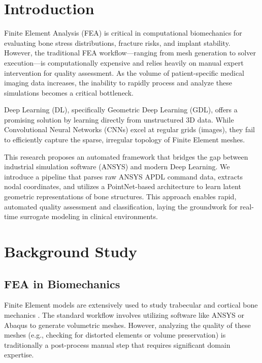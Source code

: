 \documentclass[conference]{IEEEtran}
\begin{document}
\section{Introduction}
Finite Element Analysis (FEA) is critical in computational biomechanics for evaluating bone stress distributions, fracture risks, and implant stability. However, the traditional FEA workflow—ranging from mesh generation to solver execution—is computationally expensive and relies heavily on manual expert intervention for quality assessment. As the volume of patient-specific medical imaging data increases, the inability to rapidly process and analyze these simulations becomes a critical bottleneck.

Deep Learning (DL), specifically Geometric Deep Learning (GDL), offers a promising solution by learning directly from unstructured 3D data. While Convolutional Neural Networks (CNNs) excel at regular grids (images), they fail to efficiently capture the sparse, irregular topology of Finite Element meshes. 

This research proposes an automated framework that bridges the gap between industrial simulation software (ANSYS) and modern Deep Learning. We introduce a pipeline that parses raw ANSYS APDL command data, extracts nodal coordinates, and utilizes a PointNet-based architecture to learn latent geometric representations of bone structures. This approach enables rapid, automated quality assessment and classification, laying the groundwork for real-time surrogate modeling in clinical environments.

\section{Background Study}

\subsection{FEA in Biomechanics}
Finite Element models are extensively used to study trabecular and cortical bone mechanics \cite{fea_biomech}. The standard workflow involves utilizing software like ANSYS or Abaqus to generate volumetric meshes. However, analyzing the quality of these meshes (e.g., checking for distorted elements or volume preservation) is traditionally a post-process manual step that requires significant domain expertise.
\end{document}
